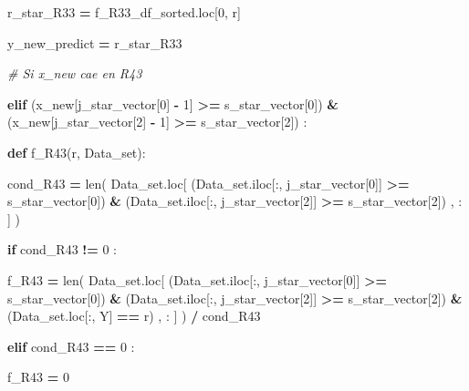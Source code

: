 \documentclass[
  11pt,
  a4paper,
]{article}
\newenvironment{Shaded}{\begin{snugshade}}{\end{snugshade}}
\newcommand{\BuiltInTok}[1]{#1}
\newcommand{\CommentTok}[1]{\textcolor[rgb]{0.56,0.35,0.01}{\textit{#1}}}
\newcommand{\ControlFlowTok}[1]{\textcolor[rgb]{0.13,0.29,0.53}{\textbf{#1}}}
\newcommand{\DecValTok}[1]{\textcolor[rgb]{0.00,0.00,0.81}{#1}}
\newcommand{\KeywordTok}[1]{\textcolor[rgb]{0.13,0.29,0.53}{\textbf{#1}}}
\newcommand{\NormalTok}[1]{#1}
\newcommand{\OperatorTok}[1]{\textcolor[rgb]{0.81,0.36,0.00}{\textbf{#1}}}
\newcommand{\StringTok}[1]{\textcolor[rgb]{0.31,0.60,0.02}{#1}}
\begin{document}
\begin{Shaded}
\begin{Highlighting}[]
\NormalTok{                r\_star\_R33 }\OperatorTok{=}\NormalTok{ f\_R33\_df\_sorted.loc[}\DecValTok{0}\NormalTok{, }\StringTok{\textquotesingle{}r\textquotesingle{}}\NormalTok{]}


\NormalTok{                y\_new\_predict }\OperatorTok{=}\NormalTok{ r\_star\_R33         }

            

        \CommentTok{\# Si x\_new cae en R43}

            \ControlFlowTok{elif}\NormalTok{ (x\_new[j\_star\_vector[}\DecValTok{0}\NormalTok{] }\OperatorTok{{-}} \DecValTok{1}\NormalTok{] }\OperatorTok{\textgreater{}=}\NormalTok{ s\_star\_vector[}\DecValTok{0}\NormalTok{]) }\OperatorTok{\&}\NormalTok{ (x\_new[j\_star\_vector[}\DecValTok{2}\NormalTok{] }\OperatorTok{{-}} \DecValTok{1}\NormalTok{] }\OperatorTok{\textgreater{}=}\NormalTok{ s\_star\_vector[}\DecValTok{2}\NormalTok{])  :}


                \KeywordTok{def}\NormalTok{ f\_R43(r, Data\_set):}

\NormalTok{                        cond\_R43 }\OperatorTok{=} \BuiltInTok{len}\NormalTok{( Data\_set.loc[ (Data\_set.iloc[:, j\_star\_vector[}\DecValTok{0}\NormalTok{]] }\OperatorTok{\textgreater{}=}\NormalTok{ s\_star\_vector[}\DecValTok{0}\NormalTok{]) }\OperatorTok{\&}\NormalTok{ (Data\_set.iloc[:, j\_star\_vector[}\DecValTok{2}\NormalTok{]] }\OperatorTok{\textgreater{}=}\NormalTok{ s\_star\_vector[}\DecValTok{2}\NormalTok{]) , : ] ) }

                        \ControlFlowTok{if}\NormalTok{  cond\_R43 }\OperatorTok{!=} \DecValTok{0}\NormalTok{ :}

\NormalTok{                            f\_R43 }\OperatorTok{=} \BuiltInTok{len}\NormalTok{( Data\_set.loc[ (Data\_set.iloc[:, j\_star\_vector[}\DecValTok{0}\NormalTok{]] }\OperatorTok{\textgreater{}=}\NormalTok{ s\_star\_vector[}\DecValTok{0}\NormalTok{]) }\OperatorTok{\&}\NormalTok{ (Data\_set.iloc[:, j\_star\_vector[}\DecValTok{2}\NormalTok{]] }\OperatorTok{\textgreater{}=}\NormalTok{ s\_star\_vector[}\DecValTok{2}\NormalTok{]) }\OperatorTok{\&}\NormalTok{ (Data\_set.loc[:, }\StringTok{\textquotesingle{}Y\textquotesingle{}}\NormalTok{] }\OperatorTok{==}\NormalTok{ r) , : ] ) }\OperatorTok{/}\NormalTok{ cond\_R43}

                        \ControlFlowTok{elif}\NormalTok{ cond\_R43 }\OperatorTok{==} \DecValTok{0}\NormalTok{ :}

\NormalTok{                            f\_R43 }\OperatorTok{=} \DecValTok{0}


\end{Highlighting}
\end{Shaded}
\end{document}
